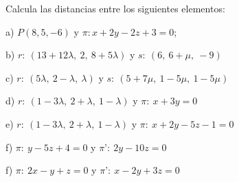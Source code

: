 \begin{ejre} Calcula las distancias entre los siguientes elementos:

	a)  $P(8,5,-6)$ y $\pi: x+2y-2z+3=0$;   		
	
	b)  $r:\  (13+12\lambda,\  2,\ 8+5\lambda)$ y $s:\  (6,\  6+\mu,\  -9)$
	
	
	c)  $r:\  (5\lambda,\  2-\lambda,\ \lambda )$ y $s:\  (5+7\mu,\  1-5\mu,\  1-5\mu)$	
	
	d)  $r:\  (1-3\lambda,\  2+\lambda, \  1-\lambda)$ y $\pi:\  x+3y=0$
	
	
	e) $r:\  (1-3\lambda,\  2+\lambda,\  1-\lambda)$ y $\pi: \ x+2y-5z-1=0$	
	
	f)  $\pi:\  y-5z+4=0$ y $\pi’:\  2y-10z=0$
	
	
	f) $\pi:\  2x-y+z=0$ y $\pi’:\  x-2y+3z=0$
\end{ejre}
	
